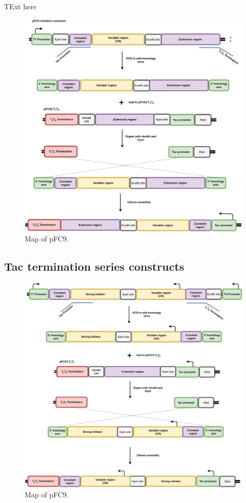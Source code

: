 \documentclass[11pt]{article}
\begin{document}
TExt here

\begin{figure}[H]
	\includegraphics[width=15cm]{images/initiation_assembly_t1t2.png}
	\centering
	\caption{Map of pFC9.}
	\label{fig:pFC8T1T2}
\end{figure}



\subsection{Tac termination series constructs}


\begin{figure}[H]
	\includegraphics[width=15cm]{images/termination_assembly_pFC53_t1t2.png}
	\centering
	\caption{Map of pFC9.}
	\label{fig:pFC8T1T2}
\end{figure}


\pagebreak


\end{document}
